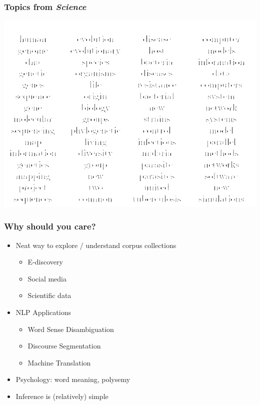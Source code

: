 \begin{frame}

\frametitle{Topics from \emph{Science}}

\begin{center}
\includegraphics[width=0.8\linewidth]{topic_models/example_topics}
\end{center}

\end{frame}


\begin{frame}

\frametitle{Why should you care?}

\begin{itemize}
\item Neat way to explore / understand corpus collections
\begin{itemize}
	\item E-discovery
	\item Social media
	\item Scientific data
\end{itemize}
\item NLP Applications
\begin{itemize}
   \item Word Sense Disambiguation
   \item Discourse Segmentation
   \item Machine Translation
\end{itemize}
\item Psychology: word meaning, polysemy
\item Inference is (relatively) simple
\end{itemize}

\end{frame}

